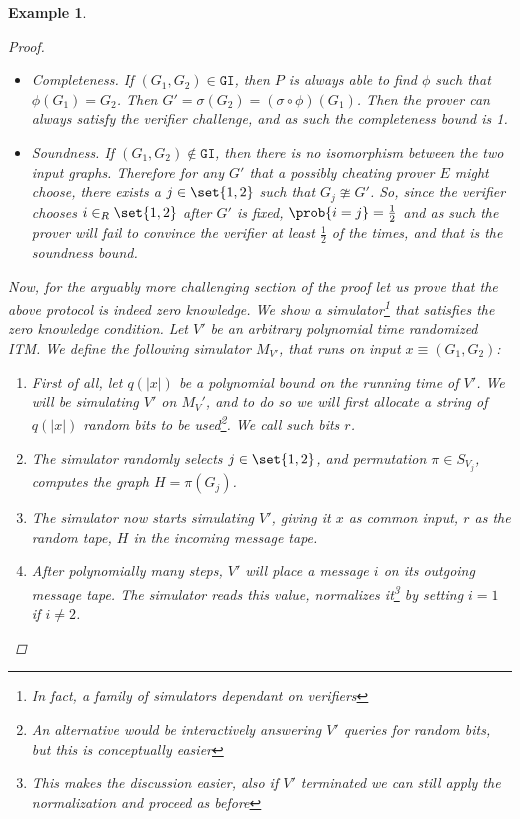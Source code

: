 \documentclass{article}
\newtheorem{example}{Example}
\begin{document}
\begin{example}
\begin{proof}
        \begin{itemize}
            \item Completeness. If $(G_1, G_2) \in \texttt{GI}$, then $P$ is always able to find $\phi$ such that
                  $\phi(G_1) = G_2$. Then $G' = \sigma(G_2) = (\sigma \circ \phi) (G_1)$. Then the prover can always satisfy the verifier challenge,
                  and as such the completeness bound is 1.
            \item Soundness. If $(G_1, G_2) \notin \texttt{GI}$, then there is no isomorphism between the two input graphs. Therefore for any $G'$ that a
                  possibly cheating prover $E$ might choose, there exists a $j \in \set{1, 2}$ such that $G_j \ncong G'$. So, since the verifier chooses $i \in_R \set{1, 2}$ after $G'$ is fixed, $\prob{i = j} = \frac{1}{2}$ and as such the prover will fail to convince the verifier
                  at least $\frac{1}{2}$ of the times, and that is the soundness bound.
        \end{itemize}
        Now, for the arguably more challenging section of the proof let us prove that the above protocol is indeed zero knowledge.
        We show a simulator\footnote{In fact, a family of simulators dependant on verifiers} that satisfies the zero knowledge condition.
        Let $V'$ be an arbitrary polynomial time randomized ITM. We define the following simulator $M_{V'}$, that runs on input $x \equiv (G_1, G_2)$:
        \begin{enumerate}
            \item First of all, let $q(|x|)$ be a polynomial bound on the running time of $V'$. We will be simulating $V'$ on $M_V'$, and to do so we will first allocate a string of $q(|x|)$ random bits to be used\footnote{An alternative would be interactively answering $V'$ queries for random bits, but this is conceptually easier}. We call such bits $r$.
            \item The simulator randomly selects $j \in \set{1, 2 }$, and permutation $\pi \in S_{V_j}$, computes the graph $H = \pi(G_j)$.
            \item The simulator now starts simulating $V'$, giving it $x$ as common input, $r$ as the random tape, $H$ in the incoming message tape.
            \item After polynomially many steps, $V'$ will place a message $i$ on its outgoing message tape. The simulator reads this value, normalizes it\footnote{This makes the discussion easier, also if $V'$ terminated we can still apply the normalization and proceed as before} by setting $i = 1$ if $i \neq 2$.

\end{enumerate}
\end{proof}
\end{example}
\end{document}

